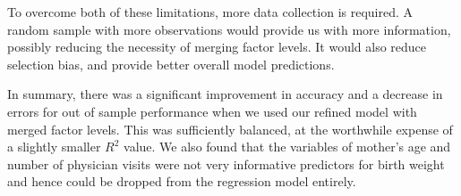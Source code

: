 \documentclass[letterpaper,9pt,twocolumn,twoside,]{pinp}
\begin{document}
To overcome both of these limitations, more data collection is required.
A random sample with more observations would provide us with more
information, possibly reducing the necessity of merging factor levels.
It would also reduce selection bias, and provide better overall model
predictions.

In summary, there was a significant improvement in accuracy and a
decrease in errors for out of sample performance when we used our
refined model with merged factor levels. This was sufficiently balanced,
at the worthwhile expense of a slightly smaller \(R^2\) value. We also
found that the variables of mother's age and number of physician visits
were not very informative predictors for birth weight and hence could be
dropped from the regression model entirely.





\end{document}

